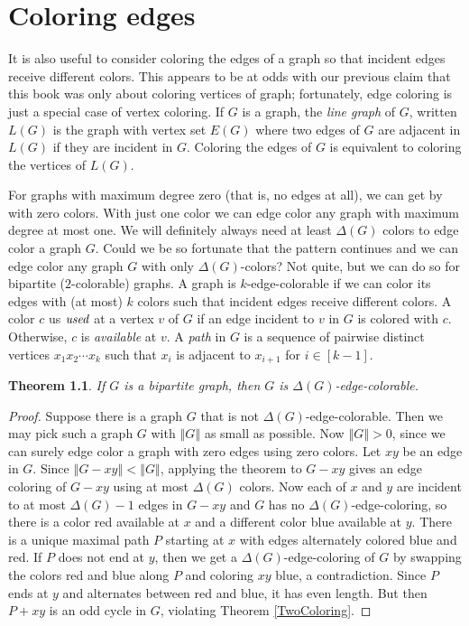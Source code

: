 \documentclass[openany]{tufte-book} %
\theoremstyle{plain}
\newtheorem{theorem}{Theorem}
\newcommand{\size}[1]{\left\Vert#1\right\Vert}
\newcommand{\irange}[1]{\left[#1\right]}
\begin{document}
\chapter{Coloring edges}
It is also useful to consider coloring the edges of a graph so that incident edges receive different colors.  This
appears to be at odds with our previous claim that this book was only about coloring vertices of graph; fortunately, edge coloring
is just a special case of vertex coloring.  If $G$ is a graph, the \emph{line graph} of $G$, written
$L(G)$ is the graph with vertex set $E(G)$ where two edges of $G$ are adjacent in $L(G)$ if they are incident in $G$.  Coloring
the edges of $G$ is equivalent to coloring the vertices of $L(G)$.

For graphs with maximum degree zero (that is, no edges at all), we can get by with zero colors.  
With just one color we can edge color any graph with maximum degree at most one.  We will definitely always need at least $\Delta(G)$ colors
to edge color a graph $G$.  Could we be so fortunate that the pattern continues
and we can edge color any graph $G$ with only $\Delta(G)$-colors? Not quite, but we can do so for bipartite ($2$-colorable) graphs.
A graph is $k$-edge-colorable if we can color its edges with (at most) $k$ colors such that incident edges receive different colors.
A color $c$ us $\emph{used}$ at a vertex $v$ of $G$ if an edge incident to $v$ in $G$ is colored with $c$. Otherwise, $c$ is \emph{available} at $v$.
A \emph{path} in $G$ is a sequence of pairwise distinct vertices $x_1x_2\cdots x_k$ such that $x_i$ is adjacent to $x_{i+1}$ for $i \in \irange{k-1}$.

\begin{theorem}\label{DeltaEdgeColoring}
If $G$ is a bipartite graph, then $G$ is $\Delta(G)$-edge-colorable.
\end{theorem}
\begin{proof}
Suppose there is a graph $G$ that is not $\Delta(G)$-edge-colorable.  Then we may pick such a graph $G$ with $\size{G}$ as small as possible.
Now $\size{G} > 0$, since we can surely edge color a graph with zero edges using zero colors.  Let $xy$ be an edge in $G$.  Since $\size{G-xy} < \size{G}$,
applying the theorem to $G-xy$ gives an edge coloring of $G-xy$ using at most $\Delta(G)$ colors.  Now each of $x$ and $y$ are incident to at most $\Delta(G) - 1$ edges
in $G-xy$ and $G$ has no $\Delta(G)$-edge-coloring, so there is a color red available at $x$ and a different color blue available at $y$.  There is a unique maximal 
path $P$ starting at $x$ with edges alternately colored blue and red. If $P$ does not end at $y$, then we get a $\Delta(G)$-edge-coloring of $G$ by swapping the colors red and blue 
along $P$ and coloring $xy$ blue, a contradiction.  Since $P$ ends at $y$ and alternates between red and blue, it has even length.  But then $P + xy$ is an odd cycle in $G$, violating
Theorem \ref{TwoColoring}.
\end{proof}
\end{document}
